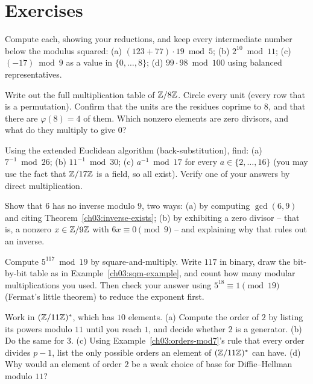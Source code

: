 \section{Exercises}

\begin{exercise}
Compute each, showing your reductions, and keep every intermediate number below the modulus squared:
(a) $(123 + 77)\cdot 19 \bmod 5$;\;
(b) $2^{10} \bmod 11$;\;
(c) $(-17) \bmod 9$ as a value in $\{0,\dots,8\}$;\;
(d) $99 \cdot 98 \bmod 100$ using balanced representatives.
\end{exercise}

\begin{exercise}[Tables]
Write out the full multiplication table of $\mathbb{Z}/8\mathbb{Z}$. Circle every unit (every row that is a permutation). Confirm that the units are the residues coprime to $8$, and that there are $\varphi(8) = 4$ of them. Which nonzero elements are zero divisors, and what do they multiply to give $0$?
\end{exercise}

\begin{exercise}[Inverses]
Using the extended Euclidean algorithm (back-substitution), find:
(a) $7^{-1} \bmod 26$;\;
(b) $11^{-1} \bmod 30$;\;
(c) $a^{-1} \bmod 17$ for every $a \in \{2,\dots,16\}$ (you may use the fact that $\mathbb{Z}/17\mathbb{Z}$ is a field, so all exist). Verify one of your answers by direct multiplication.
\end{exercise}

\begin{exercise}
Show that $6$ has no inverse modulo $9$, two ways: (a) by computing $\gcd(6,9)$ and citing Theorem~\ref{ch03:inverse-exists}; (b) by exhibiting a zero divisor -- that is, a nonzero $x \in \mathbb{Z}/9\mathbb{Z}$ with $6x \equiv 0 \pmod{9}$ -- and explaining why that rules out an inverse.
\end{exercise}

\begin{exercise}
Compute $5^{117} \bmod 19$ by square-and-multiply. Write $117$ in binary, draw the bit-by-bit table as in Example~\ref{ch03:sqm-example}, and count how many modular multiplications you used. Then check your answer using $5^{18}\equiv 1 \pmod{19}$ (Fermat's little theorem) to reduce the exponent first.
\end{exercise}

\begin{exercise}
Work in $(\mathbb{Z}/11\mathbb{Z})^{*}$, which has $10$ elements. (a) Compute the order of $2$ by listing its powers modulo $11$ until you reach $1$, and decide whether $2$ is a generator. (b) Do the same for $3$. (c) Using Example~\ref{ch03:orders-mod7}'s rule that every order divides $p-1$, list the only possible orders an element of $(\mathbb{Z}/11\mathbb{Z})^{*}$ can have. (d) Why would an element of order $2$ be a weak choice of base for Diffie--Hellman modulo $11$?
\end{exercise}

